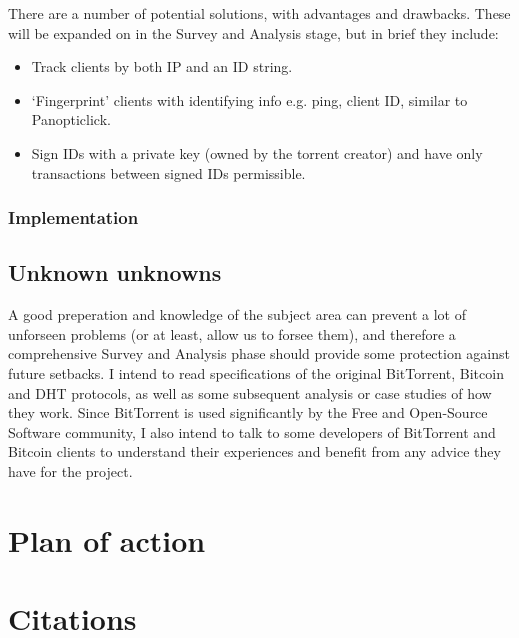 \documentclass{article}
\begin{document}
There are a number of potential solutions, with advantages and drawbacks.  These will be expanded on in the Survey and Analysis stage, but in brief they include:
\begin{itemize}
\item Track clients by both IP and an ID string.
\item `Fingerprint' clients with identifying info e.g. ping, client ID, similar to Panopticlick.
\item Sign IDs with a private key (owned by the torrent creator) and have only transactions between signed IDs permissible.
\end{itemize}

\subsubsection{Implementation}

\subsection{Unknown unknowns}
A good preperation and knowledge of the subject area can prevent a lot of unforseen problems (or at least, allow us to forsee them), and therefore a comprehensive Survey and Analysis phase should provide some protection against future setbacks.  I intend to read specifications of the original BitTorrent, Bitcoin and DHT protocols, as well as some subsequent analysis or case studies of how they work.  Since BitTorrent is used significantly by the Free and Open-Source Software community, I also intend to talk to some developers of BitTorrent and Bitcoin clients to understand their experiences and benefit from any advice they have for the project.

\section{Plan of action}

\section{Citations}
\end{document}

